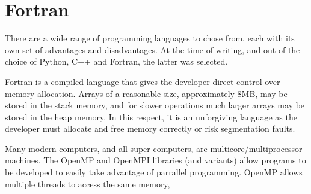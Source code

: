 \section{Fortran}

There are a wide range of programming languages to chose from, each with its own set of advantages and disadvantages.  At the time of writing, and out of the choice of Python, C++ and Fortran, the latter was selected.

Fortran is a compiled language that gives the developer direct control over memory allocation.  Arrays of a reasonable size, approximately 8MB, may be stored in the stack memory, and for slower operations much larger arrays may be stored in the heap memory.  In this respect, it is an unforgiving language as the developer must allocate and free memory correctly or risk segmentation faults.

Many modern computers, and all super computers, are multicore/multiprocessor machines.  The OpenMP and OpenMPI libraries (and variants) allow programs to be developed to easily take advantage of parrallel programming.  OpenMP allows multiple threads to access the same memory, 










